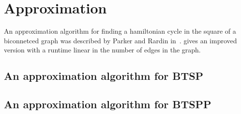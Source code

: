 \chapter{Approximation}

An approximation algorithm for finding a hamiltonian cycle in the square of a biconnetced graph was described by Parker and Rardin in~\cite{ParkerRardin1984}. \cite{alstrup2018hamiltonian} gives an improved version with a runtime linear in the number of edges in the graph.

\section{An approximation algorithm for BTSP}

\section{An approximation algorithm for BTSPP}
